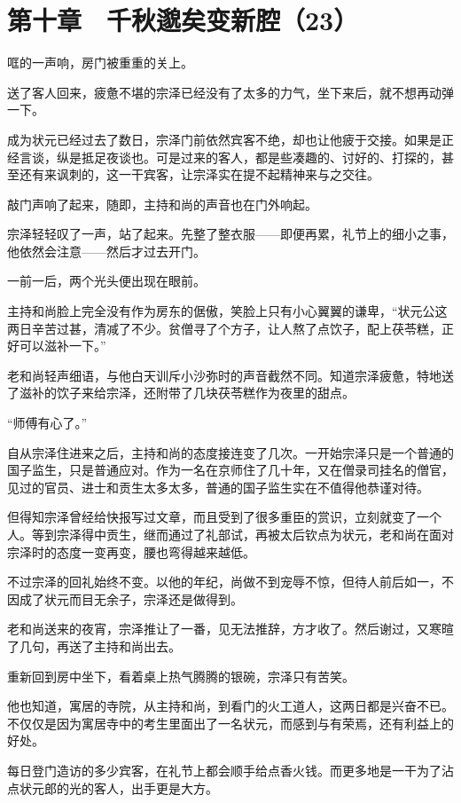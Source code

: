 \section{第十章　千秋邈矣变新腔（23）}

哐的一声响，房门被重重的关上。

送了客人回来，疲惫不堪的宗泽已经没有了太多的力气，坐下来后，就不想再动弹一下。

成为状元已经过去了数日，宗泽门前依然宾客不绝，却也让他疲于交接。如果是正经言谈，纵是抵足夜谈也。可是过来的客人，都是些凑趣的、讨好的、打探的，甚至还有来讽刺的，这一干宾客，让宗泽实在提不起精神来与之交往。

敲门声响了起来，随即，主持和尚的声音也在门外响起。

宗泽轻轻叹了一声，站了起来。先整了整衣服——即便再累，礼节上的细小之事，他依然会注意——然后才过去开门。

一前一后，两个光头便出现在眼前。

主持和尚脸上完全没有作为房东的倨傲，笑脸上只有小心翼翼的谦卑，“状元公这两日辛苦过甚，清减了不少。贫僧寻了个方子，让人熬了点饮子，配上茯苓糕，正好可以滋补一下。”

老和尚轻声细语，与他白天训斥小沙弥时的声音截然不同。知道宗泽疲惫，特地送了滋补的饮子来给宗泽，还附带了几块茯苓糕作为夜里的甜点。

“师傅有心了。”

自从宗泽住进来之后，主持和尚的态度接连变了几次。一开始宗泽只是一个普通的国子监生，只是普通应对。作为一名在京师住了几十年，又在僧录司挂名的僧官，见过的官员、进士和贡生太多太多，普通的国子监生实在不值得他恭谨对待。

但得知宗泽曾经给快报写过文章，而且受到了很多重臣的赏识，立刻就变了一个人。等到宗泽得中贡生，继而通过了礼部试，再被太后钦点为状元，老和尚在面对宗泽时的态度一变再变，腰也弯得越来越低。

不过宗泽的回礼始终不变。以他的年纪，尚做不到宠辱不惊，但待人前后如一，不因成了状元而目无余子，宗泽还是做得到。

老和尚送来的夜宵，宗泽推让了一番，见无法推辞，方才收了。然后谢过，又寒暄了几句，再送了主持和尚出去。

重新回到房中坐下，看着桌上热气腾腾的银碗，宗泽只有苦笑。

他也知道，寓居的寺院，从主持和尚，到看门的火工道人，这两日都是兴奋不已。不仅仅是因为寓居寺中的考生里面出了一名状元，而感到与有荣焉，还有利益上的好处。

每日登门造访的多少宾客，在礼节上都会顺手给点香火钱。而更多地是一干为了沾点状元郎的光的客人，出手更是大方。

